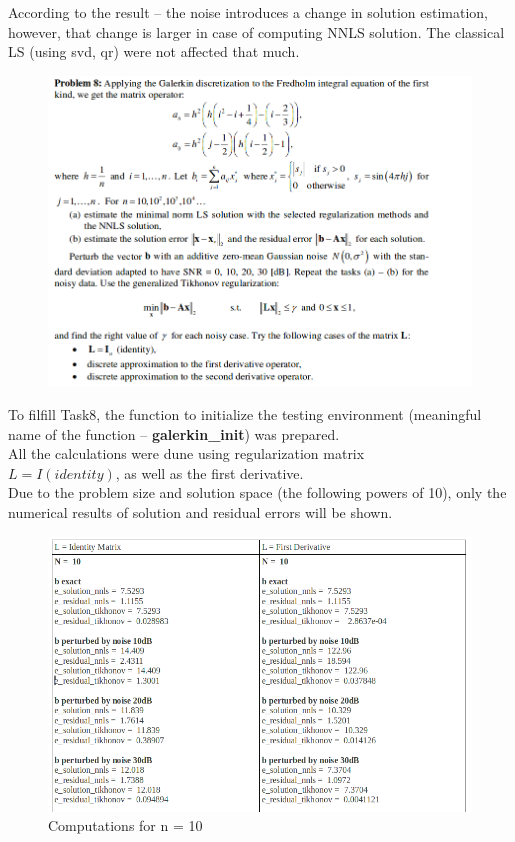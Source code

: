 \documentclass[eng,openany]{mgr}
\begin{document}
According to the result -- the noise introduces a change in solution estimation, however, that change is larger in case of computing NNLS solution. The classical LS (using svd, qr) were not affected that much.
\newpage
\begin{figure}[h]
\centering
\includegraphics[width=0.7\linewidth]{screenshot008}
\label{fig:screenshot008}
\end{figure}
To filfill Task8, the function to initialize the testing environment (meaningful name of the function -- \textbf{galerkin\_init}) was prepared.\\
All the calculations were dune using regularization matrix\\ $L = I (identity)$, as well as the first derivative.\\

Due to the problem size and solution space (the following powers of 10), only the numerical results of solution and residual errors will be shown.

\begin{figure}[h]
\centering
\includegraphics[width=0.7\linewidth]{screenshot009}
\caption{Computations for n = 10}
\label{fig:screenshot009}
\end{figure}
\end{document}
